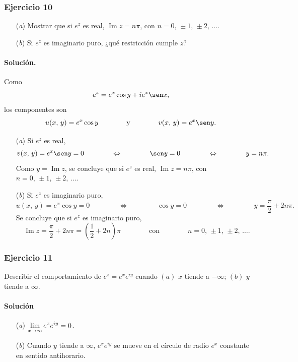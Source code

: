 \documentclass[a4paper]{report}
\renewcommand{\Im}{\operatorname{Im}}
\begin{document}
\subsubsection{Ejercicio 10}

\begin{enumerate}
 \item[(\textit{a})] Mostrar que si \(e^z\) es real, \(\Im z=n\pi\), con \(n=0,\,\pm1,\,\pm2,\,\dots\).
 \item[(\textit{b})] Si \(e^z\) es imaginario puro, ¿qué restricción cumple \(z\)?
\end{enumerate}

\paragraph{Solución.} Como
\[
 e^{z}=e^x\cos y+ie^x\sen x,
\]
los componentes son
\[
 u(x,\,y)=e^x\cos y
 \qquad\qquad\textrm{y}\qquad\qquad
 v(x,\,y)=e^x\sen y.
\]
\begin{enumerate}
 \item[(\textit{a})] Si \(e^z\) es real,
 \[
  v(x,\,y)=e^x\sen y=0
  \qquad\qquad\Leftrightarrow\qquad\qquad
  \sen y=0
  \qquad\qquad\Leftrightarrow\qquad\qquad
  y=n\pi.
 \]
 Como \(y=\Im z\), se concluye que si \(e^z\) es real, \(\Im z=n\pi\), con \(n=0,\,\pm1,\,\pm2,\,\dots\).
 \item[(\textit{b})] Si \(e^z\) es imaginario puro,
  \[
  u(x,\,y)=e^x\cos y=0
  \qquad\qquad\Leftrightarrow\qquad\qquad
  \cos y=0
  \qquad\qquad\Leftrightarrow\qquad\qquad
  y=\frac{\pi}{2}+2n\pi.
 \]
 Se concluye que si \(e^z\) es imaginario puro,
 \[
  \Im z=\frac{\pi}{2}+2n\pi=\left(\frac{1}{2}+2n\right)\pi
  \qquad\qquad\textrm{con}\qquad\qquad
  n=0,\,\pm1,\,\pm2,\,\dots.
 \]
\end{enumerate}

\subsubsection{Ejercicio 11}

Describir el comportamiento de \(e^z=e^xe^{iy}\) cuando \((a)\) \(x\) tiende a \(-\infty\); \((b)\) \(y\) tiende a \(\infty\).

\paragraph{Solución}

\begin{enumerate}
 \item[(\textit{a})] \(\displaystyle\lim_{x\to\-\infty}e^xe^{iy}=0\).
 \item[(\textit{b})] Cuando \(y\) tiende a \(\infty\), \(e^xe^{iy}\) se mueve en el círculo de radio \(e^x\) constante en sentido antihorario.
\end{enumerate}
\end{document}
